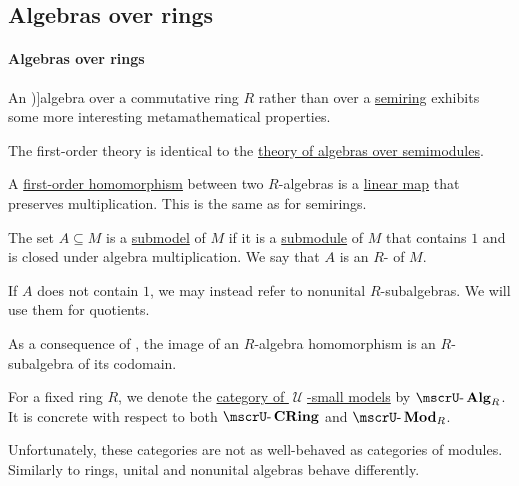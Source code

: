\subsection{Algebras over rings}\label{subsec:algebras_over_rings}

\paragraph{Algebras over rings}

\begin{definition}\label{def:algebra_over_ring}\mimprovised
  An \term[bg=алгебра (\cite[4]{КоцевСидеров2016})]{algebra} over a commutative ring \( R \) rather than over a \hyperref[def:algebra_over_semiring]{semiring} exhibits some more interesting metamathematical properties.

  \begin{thmenum}
     The first-order theory is identical to the \hyperref[def:algebra_over_semiring/theory]{theory of algebras over semimodules}.

     A \hyperref[def:first_order_homomorphism]{first-order homomorphism} between two \( R \)-algebras is a \hyperref[def:semimodule/homomorphism]{linear map} that preserves multiplication. This is the same as for semirings.

     The set \( A \subseteq M \) is a \hyperref[def:first_order_submodel]{submodel} of \( M \) if it is a \hyperref[def:monoid/submodel]{submodule} of \( M \) that contains \( 1 \) and is closed under algebra multiplication. We say that \( A \) is an \( R \)- of \( M \).

    If \( A \) does not contain \( 1 \), we may instead refer to nonunital \( R \)-subalgebras. We will use them for quotients.

    As a consequence of , the image of an \( R \)-algebra homomorphism is an \( R \)-subalgebra of its codomain.

     For a fixed ring \( R \), we denote the \hyperref[def:category_of_small_first_order_models]{category of \( \mscrU \)-small models} by \( \ucat{Alg}_R \). It is concrete with respect to both \( \ucat{CRing} \) and \( \ucat{Mod}_R \).

    Unfortunately, these categories are not as well-behaved as categories of modules. Similarly to rings, unital and nonunital algebras behave differently.


\end{thmenum}
\end{definition}
